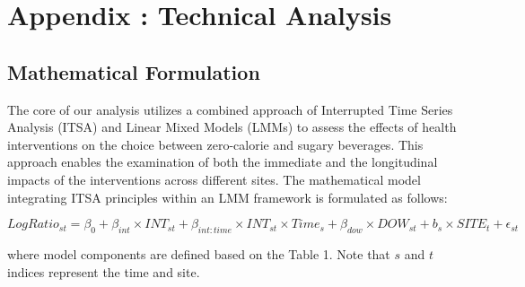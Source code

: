 \documentclass[
]{article}
\begin{document}
\pagebreak

\hypertarget{appendix-technical-analysis}{%
\section{Appendix : Technical Analysis}\label{appendix-technical-analysis}}

\hypertarget{mathematical-formulation}{%
\subsection{Mathematical Formulation}\label{mathematical-formulation}}

The core of our analysis utilizes a combined approach of Interrupted Time Series Analysis (ITSA) and Linear Mixed Models (LMMs) to assess the effects of health interventions on the choice between zero-calorie and sugary beverages. This approach enables the examination of both the immediate and the longitudinal impacts of the interventions across different sites. The mathematical model integrating ITSA principles within an LMM framework is formulated as follows:

\[
LogRatio_{st} = \beta_0 + \beta_{int}\times INT_{st} + \beta_{int:time}\times INT_{st} \times Time_s + \beta_{dow} \times  DOW_{st} + b_{s}\times SITE_t + \epsilon_{st} 
\]

where model components are defined based on the Table 1. Note that \(s\) and \(t\) indices represent the time and site.
\end{document}
